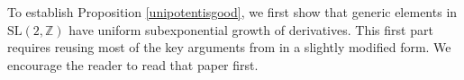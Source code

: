 \documentclass[10pt,reqno]{amsart}
\theoremstyle{Theorem}
\newtheorem{proposition}[theorem]{Proposition}
\theoremstyle{definition}
\theoremstyle{remark}
\newcommand{\note}[1]{\marginpar{{\color{red}\footnotesize \begin{spacing}{1}#1\end{spacing}}}}
\renewcommand{\epsilon}{\varepsilon}
\DeclareMathOperator{\Id}{Id}
\newcommand{\R}{\mathbb {R}}
\newcommand{\Z}{\mathbb {Z}}
\newcommand{\e}{\epsilon}
\newcommand{\Sl}{\mathrm{SL}}
\def\red{\color{red}}
\def\blue{}
\begin{document}
To establish Proposition \ref{unipotentisgood}, we first show that generic elements in $\Sl(2, \Z)$ have uniform subexponential growth of derivatives.  This first part requires reusing most of the key arguments from \cite{BFH} in a slightly modified form.  We encourage the reader to read that paper first.



%
%
%
%
%
%
%
%
\end{document}
